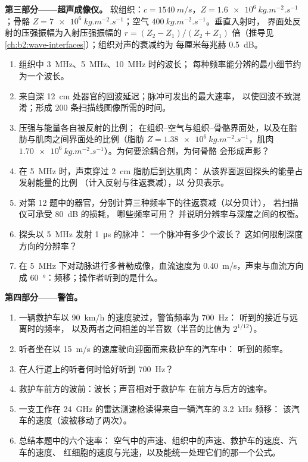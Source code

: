 \begin{problem}
\medskip
\noindent\textbf{第三部分——超声成像仪。}
软组织：$c = \qty{1540}{m/s}$，$Z = \qty{1.6e6}{kg.m^{-2}.s^{-1}}$；骨骼
$Z = \qty{7e6}{kg.m^{-2}.s^{-1}}$；空气 $\qty{400}{kg.m^{-2}.s^{-1}}$。垂直入射时，
界面处反射的压强振幅为入射压强振幅的 $r = (Z_2 -
Z_1)/(Z_2 + Z_1)$ 倍（推导见
\cref{ch:b2:wave-interfaces}）；组织对声的衰减约为
每厘米每兆赫 \qty{0.5}{dB}。
\begin{enumerate}[resume]
  \item 组织中 \qty{3}{MHz}、\qty{5}{MHz}、\qty{10}{MHz} 时的波长；
        每种频率能分辨的最小细节约为一个波长。
  \item 来自深 \qty{12}{cm} 处器官的回波延迟；脉冲可发出的最大速率，
        以使回波不致混淆；形成
        $200$ 条扫描线图像所需的时间。
  \item 压强与能量各自被反射的比例；
        在组织–空气与组织–骨骼界面处，以及在脂肪与肌肉之间界面处的比例（脂肪
        $Z = \qty{1.38e6}{kg.m^{-2}.s^{-1}}$，肌肉
        $\qty{1.70e6}{kg.m^{-2}.s^{-1}}$）。为何要涂耦合剂，为何骨骼
        会形成声影？
  \item 在 \qty{5}{MHz} 时，声束穿过 \qty{2}{cm} 脂肪后到达肌肉：
        从该界面返回探头的能量占发射能量的比例
        （计入反射与往返衰减），以
        分贝表示。
  \item 对第 12 题中的器官，分别计算三种频率下的往返衰减（以分贝计），
        若扫描仪可承受 \qty{80}{dB} 的损耗，
        哪些频率可用？
        并说明分辨率与深度之间的权衡。
  \item 探头以 \qty{5}{MHz} 发射 \qty{1}{\micro s} 的脉冲：
        一个脉冲有多少个波长？
        这如何限制深度方向的分辨率？
  \item 在 \qty{5}{MHz} 下对动脉进行多普勒成像，血流速度为 \qty{0.40}{m/s}，声束与血流方向成
        \qty{60}{\degree}：频移；操作者听到的是什么。
\end{enumerate}

\medskip
\noindent\textbf{第四部分——警笛。}
\begin{enumerate}[resume]
  \item 一辆救护车以 \qty{90}{km/h} 的速度驶过，警笛频率为 \qty{700}{Hz}：
        听到的接近与远离时的频率，
        以及两者之间相差的半音数（半音的比值为 $2^{1/12}$）。
  \item 听者坐在以 \qty{15}{m/s} 的速度驶向迎面而来救护车的汽车中：
        听到的频率。
  \item 在人行道上的听者何时恰好听到
        \qty{700}{Hz}？
  \item 救护车前方的波前：波长；声音相对于救护车
        在前方与后方的速率。
  \item 一支工作在 \qty{24}{GHz} 的雷达测速枪读得来自一辆汽车的 \qty{3.2}{kHz} 频移：
        该汽车的速度（波被移动了两次）。
  \item 总结本题中的六个速率：
        空气中的声速、组织中的声速、救护车的速度、汽车的速度、
        红细胞的速度与光速，以及能统一处理它们的那一个公式。
\end{enumerate}
\end{problem}
